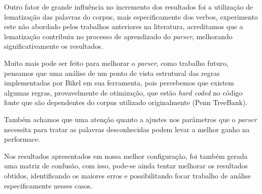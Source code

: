 Outro fator de grande influência no incremento dos resultados foi a utilização de lematização das palavras do corpus, mais especificamente dos verbos, experimento este não abordado pelos trabalhos anteriores na literatura, acreditamos que a lematização contribuiu no processo de aprendizado do \emph{parser}, melhorando significativamente os resultados.

Muito mais pode ser feito para melhorar o \emph{parser}, como trabalho futuro, pensamos que uma análise de um ponto de vista estrutural das regras implementadas por Bikel em sua ferramenta, pois percebemos que existem algumas regras, provavelmente de otimização, que estão \emph{hard coded} no código fonte que são dependentes do corpus utilizado originalmente (Penn TreeBank). 

Também achamos que uma atenção quanto a ajustes nos parâmetros que o \emph{parser} necessita para tratar as palavras desconhecidas podem levar a melhor ganho na performace.

Nos resultados apresentados em nossa melhor configuração, foi também gerada uma matriz de confusão, com isso, pode-se ainda tentar melhorar os resultados obtidos, identificando os maiores erros e possibilitando focar trabalho de análise especificamente nesses casos. 
